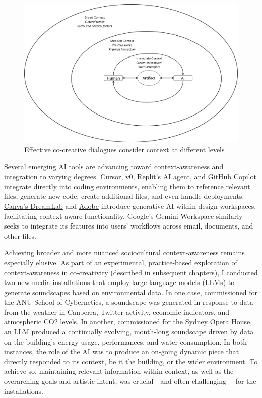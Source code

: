 \begin{figure}
    \centering
    \includegraphics[width=0.75\linewidth]{context.png}
    \caption{Effective co-creative dialogues consider context at different levels}
    \label{fig:enter-label}
\end{figure}

Several emerging AI tools are advancing toward context-awareness and integration to varying degrees. \href{https://www.cursor.com/}{Cursor}, \href{https://v0.dev/}{v0}, \href{https://replit.com/ai}{Replit's AI agent}, and \href{https://github.com/features/copilot}{GitHub Copilot} integrate directly into coding environments, enabling them to reference relevant files, generate new code, create additional files, and even handle deployments. \href{https://www.canva.com/}{Canva's DreamLab} and \href{https://www.adobe.com/au/products/firefly.html}{Adobe} introduce generative AI within design workspaces, facilitating context-aware functionality. Google's Gemini Workspace similarly seeks to integrate its features into users' workflows across email, documents, and other files.

Achieving broader and more nuanced sociocultural context-awareness remains especially elusive. As part of an experimental, practice-based exploration of context-awareness in co-creativity (described in subsequent chapters), I conducted two new media installations that employ large language models (LLMs) to generate soundscapes based on environmental data. In one case, commissioned for the ANU School of Cybernetics, a soundscape was generated in response to data from the weather in Canberra, Twitter activity, economic indicators, and atmospheric CO2 levels. In another, commissioned for the Sydney Opera House, an LLM produced a continually evolving, month-long soundscape driven by data on the building's energy usage, performances, and water consumption. In both instances, the role of the AI was to produce an on-going dynamic piece that directly responded to its context, be it the building, or the wider environment. To achieve so, maintaining relevant information within context, as well as the overarching goals and artistic intent, was crucial—and often challenging— for the installations.


